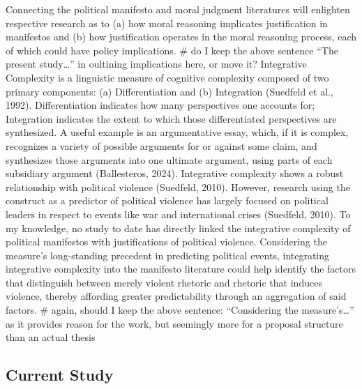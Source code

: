 \documentclass[
  english,
  man]{apa6}
\begin{document}
Connecting the political manifesto and moral judgment literatures will enlighten respective
research as to (a) how moral reasoning implicates justification in manifestos and (b) how
justification operates in the moral reasoning process, each of which could have policy
implications.
\#\textbar{} do I keep the above sentence ``The present study\ldots{}'' in oultining implications here, or move it?
Integrative Complexity is a linguistic measure of cognitive complexity composed of two primary components: (a) Differentiation and (b) Integration (Suedfeld et al., 1992). Differentiation indicates how many perspectives one accounts for; Integration indicates the extent to which those differentiated perspectives are synthesized. A useful example is an argumentative essay, which, if it is complex, recognizes a variety of possible arguments for or against some claim, and synthesizes those arguments into one ultimate argument, using parts of each subsidiary argument (Ballesteros, 2024). Integrative complexity shows a robust relationship with political violence (Suedfeld, 2010). However, research using the construct as a predictor of political violence has largely focused on political leaders in respect to events like war and international crises (Suedfeld, 2010). To my knowledge, no study to date has directly linked the integrative complexity of political manifestos with justifications of political violence. Considering the measure's long-standing precedent in predicting political events, integrating integrative complexity into the manifesto literature could help identify the factors that distinguish between merely violent rhetoric and rhetoric that induces violence, thereby affording greater predictability through an aggregation of said factors.
\#\textbar{} again, should I keep the above sentence: ``Considering the measure's\ldots{}'' as it provides reason for the work, but seemingly more for a proposal structure than an actual thesis

\subsection{Current Study}\label{current-study}
\end{document}
